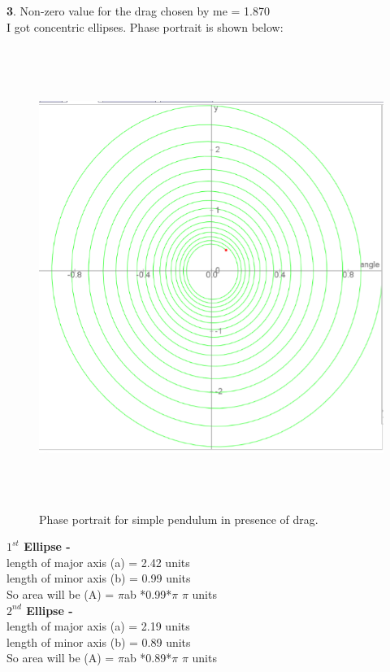 \documentclass[11pt]{scrartcl} %
\begin{document}
\newpage
\textbf{3}.
Non-zero value for the drag chosen by me = 1.870 \\
I got concentric ellipses. Phase portrait is shown below:
\begin{figure}[h] %
	\centering
	\includegraphics[width=\textwidth, height=15cm]{Figures/M3.png} %
	\caption{Phase portrait for simple pendulum in presence of drag.}
\end{figure}

\textbf{$1^{st}$ Ellipse - }\\
length of major axis (a) = 2.42  units\\
length of minor axis (b) = 0.99 units\\

So area will be (A) = $\pi$ab *0.99*$\pi$ $\pi$ units\\
\textbf{$2^{nd}$ Ellipse - }\\
length of major axis (a) = 2.19 units\\
length of minor axis (b) = 0.89 units\\

So area will be (A) = $\pi$ab *0.89*$\pi$ $\pi$ units\\
\end{document}
